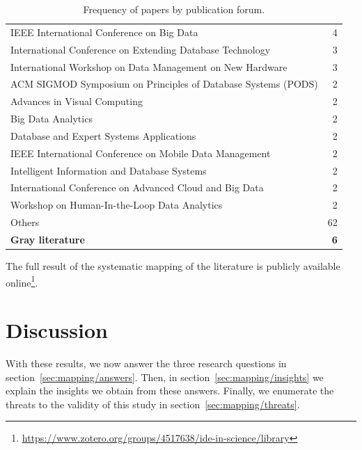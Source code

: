 \begin{table}[hptb]
\begin{tabularx}{\textwidth}{X r}
      \hspace{0.5em} IEEE International Conference on Big Data & 4 \\
      \hspace{0.5em} International Conference on Extending Database Technology & 3 \\
      \hspace{0.5em} International Workshop on Data Management on New Hardware & 3 \\
      \hspace{0.5em} ACM SIGMOD Symposium on Principles of Database Systems (PODS) & 2 \\
      \hspace{0.5em} Advances in Visual Computing & 2 \\
      \hspace{0.5em} Big Data Analytics & 2 \\
      \hspace{0.5em} Database and Expert Systems Applications & 2 \\
      \hspace{0.5em} IEEE International Conference on Mobile Data Management & 2 \\
      \hspace{0.5em} Intelligent Information and Database Systems & 2 \\
      \hspace{0.5em} International Conference on Advanced Cloud and Big Data & 2 \\
      \hspace{0.5em} Workshop on Human-In-the-Loop Data Analytics & 2 \\
      \hspace{0.5em} Others & 62 \\
    \textbf{Gray literature} & \textbf{6}
  \end{tabularx}
  \caption{Frequency of papers by publication forum.}\label{tab:mapping/publication}
\end{table}

The full result of the systematic mapping of the literature is publicly
available online\footnote{\url{https://www.zotero.org/groups/4517638/ide-in-science/library}}.

\section{Discussion}
\label{sec:mapping/discussion}

With these results, we now answer the three research questions in
section~\ref{sec:mapping/answers}. Then, in section~\ref{sec:mapping/insights}
we explain the insights we obtain from these answers. Finally,
we enumerate the threats to the validity of this study in
section~\ref{sec:mapping/threats}.

